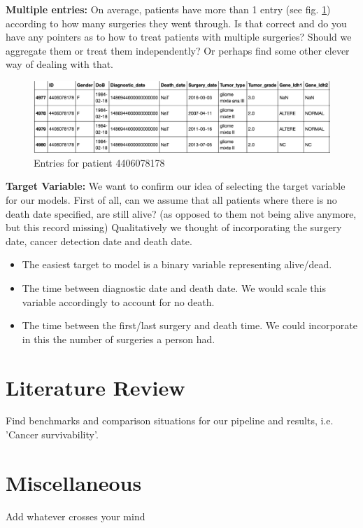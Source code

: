 \documentclass[a4paper]{article}
\begin{document}
%
\textbf{Multiple entries:} On average, patients have more than 1 entry (see fig. \ref{fig:m_entries}) according to how many surgeries they went through. Is that correct and do you have any pointers as to how to treat patients with multiple surgeries? Should we aggregate them or treat them independently? Or perhaps find some other clever way of dealing with that. 
\begin{figure}[H]
\centering
\includegraphics[width=1.0\linewidth]{images/multiple_entries.png}
\caption{Entries for patient 4406078178}
\label{fig:m_entries}
\end{figure}
% 
\textbf{Target Variable:}
We want to confirm our idea of selecting the target variable for our models. 
First of all, can we assume that all patients where there is no death date specified, are still alive? (as opposed to them not being alive anymore, but this record missing)
Qualitatively we thought of incorporating the surgery date, cancer detection date and death date. 
\begin{itemize}
\item The easiest target to model is a binary variable representing alive/dead.
\item The time between diagnostic date and death date. We would scale this variable accordingly to account for no death. 
\item The time between the first/last surgery and death time. We could incorporate in this the number of surgeries a person had. 
\end{itemize}
%
%
\section{Literature Review}
Find benchmarks and comparison situations for our pipeline and results, i.e. 'Cancer survivability'.

\section{Miscellaneous}
Add whatever crosses your mind


\end{document}
